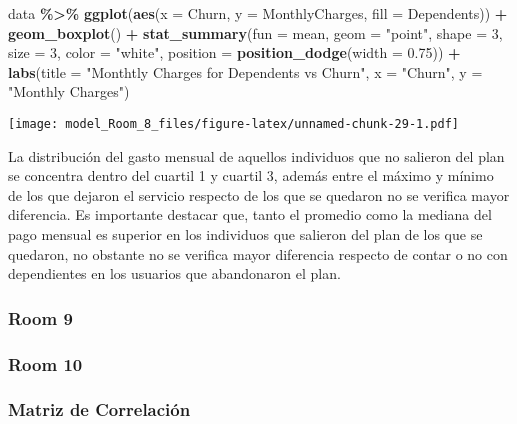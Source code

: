 \documentclass[
]{article}
\newenvironment{Shaded}{\begin{snugshade}}{\end{snugshade}}
\newcommand{\AttributeTok}[1]{\textcolor[rgb]{0.13,0.29,0.53}{#1}}
\newcommand{\DecValTok}[1]{\textcolor[rgb]{0.00,0.00,0.81}{#1}}
\newcommand{\FloatTok}[1]{\textcolor[rgb]{0.00,0.00,0.81}{#1}}
\newcommand{\FunctionTok}[1]{\textcolor[rgb]{0.13,0.29,0.53}{\textbf{#1}}}
\newcommand{\NormalTok}[1]{#1}
\newcommand{\SpecialCharTok}[1]{\textcolor[rgb]{0.81,0.36,0.00}{\textbf{#1}}}
\newcommand{\StringTok}[1]{\textcolor[rgb]{0.31,0.60,0.02}{#1}}
\begin{document}
\begin{Shaded}
\begin{Highlighting}[]
\NormalTok{data }\SpecialCharTok{\%\textgreater{}\%}
  \FunctionTok{ggplot}\NormalTok{(}\FunctionTok{aes}\NormalTok{(}\AttributeTok{x =}\NormalTok{ Churn, }\AttributeTok{y =}\NormalTok{ MonthlyCharges, }\AttributeTok{fill =}\NormalTok{ Dependents)) }\SpecialCharTok{+}
  \FunctionTok{geom\_boxplot}\NormalTok{() }\SpecialCharTok{+}
  \FunctionTok{stat\_summary}\NormalTok{(}\AttributeTok{fun =}\NormalTok{ mean, }\AttributeTok{geom =} \StringTok{"point"}\NormalTok{, }\AttributeTok{shape =} \DecValTok{3}\NormalTok{, }\AttributeTok{size =} \DecValTok{3}\NormalTok{, }\AttributeTok{color =} \StringTok{"white"}\NormalTok{, }\AttributeTok{position =} \FunctionTok{position\_dodge}\NormalTok{(}\AttributeTok{width =} \FloatTok{0.75}\NormalTok{)) }\SpecialCharTok{+}
  \FunctionTok{labs}\NormalTok{(}\AttributeTok{title =} \StringTok{"Monthtly Charges for Dependents vs Churn"}\NormalTok{,}
       \AttributeTok{x =} \StringTok{"Churn"}\NormalTok{,}
       \AttributeTok{y =} \StringTok{"Monthly Charges"}\NormalTok{)}
\end{Highlighting}
\end{Shaded}

\texttt{[image: model\_Room\_8\_files/figure-latex/unnamed-chunk-29-1.pdf]}

La distribución del gasto mensual de aquellos individuos que no salieron
del plan se concentra dentro del cuartil 1 y cuartil 3, además entre el
máximo y mínimo de los que dejaron el servicio respecto de los que se
quedaron no se verifica mayor diferencia. Es importante destacar que,
tanto el promedio como la mediana del pago mensual es superior en los
individuos que salieron del plan de los que se quedaron, no obstante no
se verifica mayor diferencia respecto de contar o no con dependientes en
los usuarios que abandonaron el plan.

\hypertarget{room-9}{%
\subsubsection{Room 9}\label{room-9}}

\hypertarget{room-10}{%
\subsubsection{Room 10}\label{room-10}}

\hypertarget{matriz-de-correlaciuxf3n}{%
\subsubsection{Matriz de Correlación}\label{matriz-de-correlaciuxf3n}}
\end{document}

